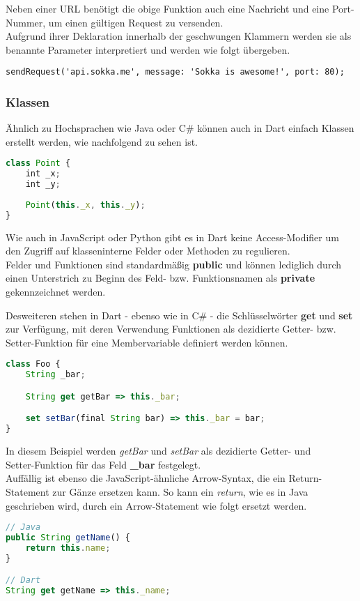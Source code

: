 Neben einer URL benötigt die obige Funktion auch eine Nachricht und eine Port-Nummer,
um einen gültigen Request zu versenden.\\
Aufgrund ihrer Deklaration innerhalb der geschwungen Klammern
werden sie als benannte Parameter interpretiert und werden wie folgt übergeben.

\begin{lstlisting}
sendRequest('api.sokka.me', message: 'Sokka is awesome!', port: 80);
\end{lstlisting}

\subsubsection{Klassen}

Ähnlich zu Hochsprachen wie Java oder C\# können auch in Dart einfach Klassen
erstellt werden, wie nachfolgend zu sehen ist.

\begin{lstlisting}[language=JavaScript]
class Point {
    int _x;
    int _y;
    
    Point(this._x, this._y);
}
\end{lstlisting}

Wie auch in JavaScript oder Python gibt es in Dart keine Access-Modifier um den Zugriff
auf klasseninterne Felder oder Methoden zu regulieren.\\
Felder und Funktionen sind standardmäßig \textbf{public} und können lediglich durch
einen Unterstrich zu Beginn des Feld- bzw. Funktionsnamen als \textbf{private} gekennzeichnet
werden.

Desweiteren stehen in Dart - ebenso wie in C\# - die Schlüsselwörter \textbf{get} und 
\textbf{set} zur Verfügung, mit deren Verwendung Funktionen als dezidierte Getter- bzw.
Setter-Funktion für eine Membervariable definiert werden können.

\begin{lstlisting}[language=JavaScript]
class Foo {
    String _bar;

    String get getBar => this._bar;

    set setBar(final String bar) => this._bar = bar;
}
\end{lstlisting}

In diesem Beispiel werden \textit{getBar} und \textit{setBar} als dezidierte Getter- und\\
Setter-Funktion für das Feld \textbf{\_bar} festgelegt.\\
Auffällig ist ebenso die JavaScript-ähnliche Arrow-Syntax, die ein Return-Statement
zur Gänze ersetzen kann.
So kann ein \textit{return}, wie es in Java geschrieben wird, durch ein Arrow-Statement wie folgt
ersetzt werden.

\begin{lstlisting}[language=JavaScript]
// Java
public String getName() {
    return this.name;
}

// Dart
String get getName => this._name;
\end{lstlisting}